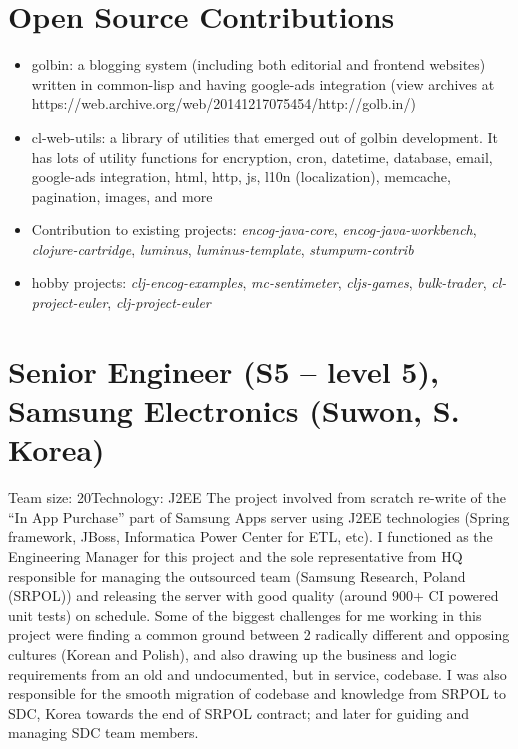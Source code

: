 \documentclass[11pt,a4paper,sans]{moderncv} %
\begin{document}
\section{Open Source Contributions}
         {\begin{itemize}
           \item golbin: a blogging system (including both editorial and frontend websites) written in common-lisp and having google-ads integration (view archives at https://web.archive.org/web/20141217075454/http://golb.in/)
           \item cl-web-utils: a library of utilities that emerged out of golbin development. It has lots of utility functions for encryption, cron, datetime, database, email, google-ads integration, html, http, js, l10n (localization), memcache, pagination, images, and more
           \item Contribution to existing projects: \textit{encog-java-core}, \textit{encog-java-workbench}, \textit{clojure-cartridge}, \textit{luminus}, \textit{luminus-template}, \textit{stumpwm-contrib}
           \item hobby projects: \textit{clj-encog-examples}, \textit{mc-sentimeter}, \textit{cljs-games}, \textit{bulk-trader}, \textit{cl-project-euler}, \textit{clj-project-euler}
         \end{itemize}}

\newpage{}
\section{Senior Engineer (S5 -- level 5), Samsung Electronics (Suwon, S. Korea)}
         {Team size: 20}{Technology: J2EE}
         {The project involved from scratch re-write of the ``In App Purchase'' part of Samsung Apps server using J2EE technologies (Spring framework, JBoss, Informatica Power Center for ETL, etc). I functioned as the Engineering Manager for this project and the sole representative from HQ responsible for managing the outsourced team (Samsung Research, Poland (SRPOL)) and releasing the server with good quality (around 900+ CI powered unit tests) on schedule. Some of the biggest challenges for me working in this project were finding a common ground between 2 radically different and opposing cultures (Korean and Polish), and also drawing up the business and logic requirements from an old and undocumented, but in service, codebase. I was also responsible for the smooth migration of codebase and knowledge from SRPOL to SDC, Korea towards the end of SRPOL contract; and later for guiding and managing SDC team members.}
\end{document}
